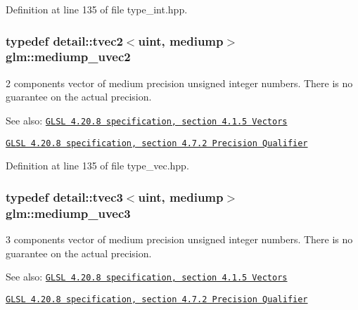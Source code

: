 Definition at line 135 of file type\_\-int.hpp.\hypertarget{group__core__precision_g15c8fb77bdb6763ef73b39e02eb98a56}{
\subsubsection[mediump\_\-uvec2]{\setlength{\rightskip}{0pt plus 5cm}typedef detail::tvec2$<$uint, mediump$>$ {\bf glm::mediump\_\-uvec2}}}
\label{group__core__precision_g15c8fb77bdb6763ef73b39e02eb98a56}


2 components vector of medium precision unsigned integer numbers. There is no guarantee on the actual precision.

\begin{Desc}
\item[See also:]\href{http://www.opengl.org/registry/doc/GLSLangSpec.4.20.8.pdf}{\tt GLSL 4.20.8 specification, section 4.1.5 Vectors} 

\href{http://www.opengl.org/registry/doc/GLSLangSpec.4.20.8.pdf}{\tt GLSL 4.20.8 specification, section 4.7.2 Precision Qualifier} \end{Desc}


Definition at line 135 of file type\_\-vec.hpp.\hypertarget{group__core__precision_gebdefe98b08421ef645f65c706af46b2}{
\subsubsection[mediump\_\-uvec3]{\setlength{\rightskip}{0pt plus 5cm}typedef detail::tvec3$<$uint, mediump$>$ {\bf glm::mediump\_\-uvec3}}}
\label{group__core__precision_gebdefe98b08421ef645f65c706af46b2}


3 components vector of medium precision unsigned integer numbers. There is no guarantee on the actual precision.

\begin{Desc}
\item[See also:]\href{http://www.opengl.org/registry/doc/GLSLangSpec.4.20.8.pdf}{\tt GLSL 4.20.8 specification, section 4.1.5 Vectors} 

\href{http://www.opengl.org/registry/doc/GLSLangSpec.4.20.8.pdf}{\tt GLSL 4.20.8 specification, section 4.7.2 Precision Qualifier} \end{Desc}



